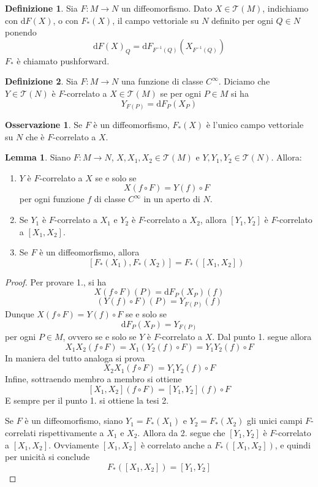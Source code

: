 \documentclass[a4paper,11pt]{article}
\theoremstyle{definition}
\newtheorem{osservazione}{Osservazione}[section]
\newtheorem{definizione}{Definizione}[section]
\theoremstyle{theorem}
\newtheorem{lemma}[teorema]{Lemma}
\newcommand{\dif}{\mathrm{d}}
\begin{document}
\begin{definizione}
	Sia $F\colon M\to N$ un diffeomorfismo. Dato $X\in\mathcal{T}(M)$, indichiamo con $\dif F(X)$, o con $F_*(X)$, il campo vettoriale su $N$ definito per ogni $Q\in N$ ponendo
	\[\dif F(X)_Q=\dif F_{F^{-1}(Q)}(X_{F^{-1}(Q)})\]
	$F_*$ è chiamato pushforward.
\end{definizione}
\begin{definizione}
	Sia $F\colon M\to N$ una funzione di classe $C^\infty$. Diciamo che $Y\in\mathcal{T}(N)$ è $F$-correlato a $X\in\mathcal{T}(M)$ se per ogni $P\in M$ si ha
	\[Y_{F(P)}=\dif F_P(X_P)\]
\end{definizione}
\begin{osservazione}
	Se $F$ è un diffeomorfismo, $F_*(X)$ è l'unico campo vettoriale su $N$ che è $F$-correlato a $X$.
\end{osservazione}
\begin{lemma}
	Siano $F\colon M\to N$, $X,X_1,X_2\in\mathcal{T}(M)$ e $Y,Y_1,Y_2\in\mathcal{T}(N)$. Allora:
	\begin{enumerate}
		\item $Y$ è $F$-correlato a $X$ se e solo se
		\[X(f\circ F)=Y(f)\circ F\]
		per ogni funzione $f$ di classe $C^\infty$ in un aperto di $N$.
		\item Se $Y_1$ è $F$-correlato a $X_1$ e $Y_2$ è $F$-correlato a $X_2$, allora $[Y_1,Y_2]$ è $F$-correlato a $[X_1,X_2]$.
		\item Se $F$ è un diffeomorfismo, allora
		\[[F_*(X_1),F_*(X_2)]=F_*([X_1,X_2])\]
	\end{enumerate}
\end{lemma}
\begin{proof}
	Per provare 1., si ha
	\[X(f\circ F)(P)=\dif F_P(X_P)(f)\]
	\[(Y(f)\circ F)(P)=Y_{F(P)}(f)\]
	Dunque $X(f\circ F)=Y(f)\circ F$ se e solo se
	\[\dif F_P(X_P)=Y_{F(P)}\]
	per ogni $P\in M$, ovvero se e solo se $Y$ è $F$-correlato a $X$. Dal punto 1. segue allora
	\[X_1X_2(f\circ F)=X_1(Y_2(f)\circ F)=Y_1Y_2(f)\circ F\]
	In maniera del tutto analoga si prova
	\[X_2X_1(f\circ F)=Y_1Y_2(f)\circ F\]
	Infine, sottraendo membro a membro si ottiene
	\[[X_1,X_2](f\circ F)=[Y_1,Y_2](f)\circ F\]
	E sempre per il punto 1. si ottiene la tesi 2.
	
	Se $F$ è un diffeomorfismo, siano $Y_1=F_*(X_1)$ e $Y_2=F_*(X_2)$ gli unici campi $F$-correlati rispettivamente a $X_1$ e $X_2$. Allora da 2. segue che $[Y_1,Y_2]$ è $F$-correlato a $[X_1,X_2]$. Ovviamente $[X_1,X_2]$ è correlato anche a $F_*([X_1,X_2])$, e quindi per unicità si conclude
	\[F_*([X_1,X_2])=[Y_1,Y_2]\]
\end{proof}
\end{document}
